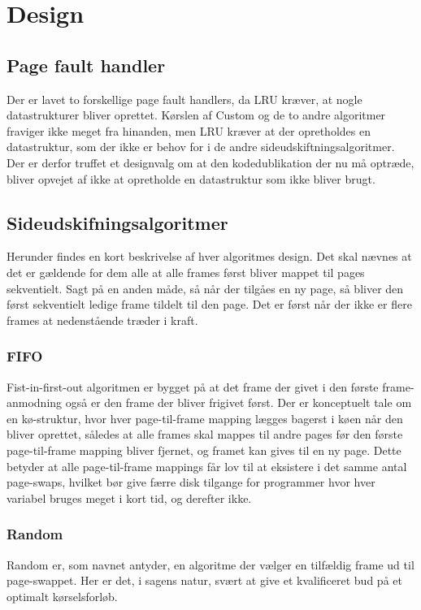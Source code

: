 \section{Design}
\label{sec:design}

\subsection{Page fault handler}
Der er lavet to forskellige page fault handlers, da LRU kræver, at nogle datastrukturer bliver oprettet. Kørslen af Custom og de to andre algoritmer fraviger ikke meget fra hinanden, men LRU kræver at der opretholdes en datastruktur, som der ikke er behov for i de andre sideudskiftningsalgoritmer. Der er derfor truffet et designvalg om at den kodedublikation der nu må optræde, bliver opvejet af ikke at opretholde en datastruktur som ikke bliver brugt.  

\subsection{Sideudskifningsalgoritmer}
Herunder findes en kort beskrivelse af hver algoritmes design. Det skal nævnes at det er gældende for dem alle at alle frames først bliver mappet til pages sekventielt. Sagt på en anden måde, så når der tilgåes en ny page, så bliver den først sekventielt ledige frame tildelt til den page. Det er først når der ikke er flere frames at nedenstående træder i kraft.   
	
	\subsubsection{FIFO}
	Fist-in-first-out algoritmen er bygget på at det frame der givet i den første frame-anmodning også er den frame der bliver frigivet først. Der er konceptuelt tale om en kø-struktur, hvor hver page-til-frame mapping lægges bagerst i køen når den bliver oprettet, således at alle frames skal mappes til andre pages før den første page-til-frame mapping bliver fjernet, og framet kan gives til en ny page. Dette betyder at alle page-til-frame mappings får lov til at eksistere i det samme antal page-swaps, hvilket bør give færre disk tilgange for programmer hvor hver variabel bruges meget i kort tid, og derefter ikke. 
	\subsubsection{Random}
	Random er, som navnet antyder, en algoritme der vælger en tilfældig frame ud til page-swappet. Her er det, i sagens natur, svært at give et kvalificeret bud på et optimalt kørselsforløb.
